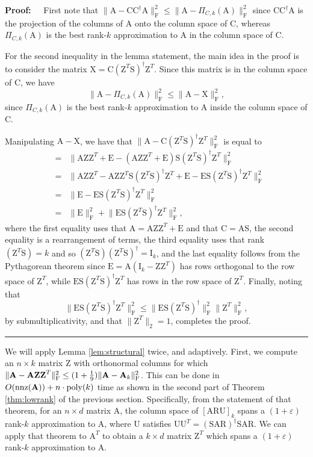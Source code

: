 \documentclass[11pt]{article}
\newcommand{\FNormS}[1]{\mbox{}\|#1\|_\mathrm{F}^2}
\newenvironment{proof}{\begin{trivlist} \item {\bf Proof:~~}}
  {\qed\end{trivlist}}
\newcommand{\mat}[1]{{\ensuremath{\bm{\mathrm{#1}}}}}
\def\matA{\mat{A}}
\def\matC{\mat{C}}
\def\matE{\mat{E}}
\def\matI{\mat{I}}
\def\matR{\mat{R}}
\def\matS{\mat{S}}
\def\matU{\mat{U}}
\def\matX{\mat{X}}
\def\matZ{\mat{Z}}
\def\nnz{{ \rm nnz }}
\def\frac#1#2{{#1\over #2}}
\def\qed{\hfill\rule{2mm}{2mm}}
\newcommand{\eps}{\varepsilon}
\newcommand{\poly}{{\mathrm{poly}}}
\begin{document}
\begin{proof}
First note that 
$\FNormS{\matA - \matC \matC^{\dagger} \matA} \le
  \FNormS{\matA - \Pi_{C,k}(\matA)}$ since $\matC \matC^{\dagger} \matA$ is the projection of the columns of $\matA$ onto the column
space of $\matC$, whereas $\Pi_{C, k}(\matA)$ is the best rank-$k$ approximation to $\matA$ in the column space of $\matC$. 

For the second inequality in the lemma statement, 
the main idea in the proof is to consider the matrix $\matX = \matC(\matZ^T \matS)^{\dagger} \matZ^T$. 
Since this matrix is in the column space
of $\matC$, we have 
$$\FNormS{\matA - \Pi_{C,k}(\matA)} \leq \FNormS{\matA-\matX},$$
since $\Pi_{C,k}(\matA)$ is the best rank-$k$ approximation to $\matA$ inside the column space of $\matC$. 

Manipulating $\matA-\matX$, we have that $\FNormS{\matA-\matC(\matZ^T\matS)^{\dagger} \matZ^T}$ is equal to 
\begin{eqnarray*}
& = & \FNormS{\matA\matZ\matZ^T + \matE - (\matA\matZ\matZ^T + \matE)\matS (\matZ^T \matS)^{\dagger} \matZ^T}\\
& = & \FNormS{\matA\matZ\matZ^T - \matA\matZ\matZ^T \matS(\matZ^T \matS)^{\dagger} \matZ^T + \matE - \matE \matS (\matZ^T \matS)^{\dagger} \matZ^T}\\
& = & \FNormS{\matE - \matE\matS(\matZ^T \matS)^{\dagger} \matZ^T}\\
& = & \FNormS{\matE} + \FNormS{\matE\matS(\matZ^T \matS)^{\dagger} \matZ^T},
\end{eqnarray*}
where the first equality uses that $\matA = \matA\matZ\matZ^T + \matE$ and that $\matC = \matA\matS$, 
the second equality is a rearrangement of terms,
the third equality uses that rank$(\matZ^T \matS) = k$ and so $(\matZ^T \matS)(\matZ^T \matS)^{\dagger} = \matI_{k}$, 
and the last equality follows from
the Pythagorean theorem since $\matE = \matA(\matI_{k}-\matZ\matZ^T)$ 
has rows orthogonal to the row space of $\matZ^T$, while 
$\matE\matS(\matZ^T \matS)^{\dagger} \matZ^T$ has rows in the row space of $\matZ^T$. Finally, noting that 
$$\FNormS{\matE\matS(\matZ^T \matS)^{\dagger} \matZ^T} \leq \FNormS{\matE\matS(\matZ^T \matS)^{\dagger}} \FNormS{\matZ^T},$$
by submultiplicativity, and that $\|\matZ^T\|_2 = 1$, completes the proof. 
\end{proof}
We will apply Lemma \ref{lem:structural} twice, and adaptively. First, we compute an $n \times k$ matrix $\matZ$ with
orthonormal columns for which $\FNormS{\matA-\matA\matZ\matZ^T} \leq (1+\frac{1}{9})\FNormS{\matA-\matA_k}$. 
This can be done in $O(\nnz(\matA)) + n \cdot \poly(k)$
time as shown in the second part of Theorem \ref{thm:lowrank} of the previous section. Specifically, from the statement of that theorem,
for an $n \times d$ matrix $\matA$, the column space of $[\matA\matR\matU]_k$ spans a $(1+\eps)$ rank-$k$ approximation to $\matA$, where
$\matU$ satisfies $\matU\matU^T = (\matS\matA\matR)^{\dagger} \matS\matA\matR$. We can apply that theorem to $\matA^T$ to obtain a $k \times d$
matrix $\matZ^T$ which spans a $(1+\eps)$ rank-$k$ approximation to $\matA$. 
\end{document}
